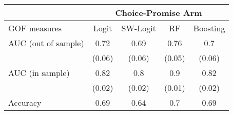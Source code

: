 \begin{tabular}{lcccc}
\toprule
      & \multicolumn{4}{c}{Choice-Promise Arm} \\
\midrule
\midrule
GOF measures & Logit & SW-Logit & RF    & Boosting \\
\midrule
\midrule
AUC (out of sample) & 0.72  & 0.69  & 0.76  & 0.7 \\
      & (0.06) & (0.06) & (0.05) & (0.06) \\
AUC (in sample) & 0.82  & 0.8   & 0.9   & 0.82 \\
      & (0.02) & (0.02) & (0.01) & (0.02) \\
Accuracy & 0.69  & 0.64  & 0.7   & 0.69 \\
\bottomrule
\bottomrule
\end{tabular}%
